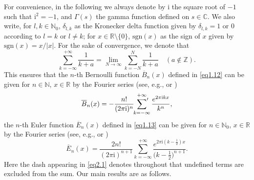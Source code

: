 \documentclass[reqno]{amsart}
\numberwithin{equation}{section}
\begin{document}
For convenience, in the following we always denote by $\mathrm{i}$ the square root of $-1$ such that $\mathrm{i}^{2}=-1$, and $\Gamma(s)$ the gamma function defined on $s\in\mathbb{C}$. We also write, for $l,k\in\mathbb{N}_{0}$, $\delta_{l,k}$ as the Kronecker delta function given by $\delta_{l,k}=1$ or $0$ according to $l=k$ or $l\not=k$; for $x\in\mathbb{R}\setminus\{0\}$, $\mathrm{sgn}(x)$ as the sign of $x$ given by $\mathrm{sgn}(x)=x/|x|$. For the sake of convergence, we denote that
\begin{equation*}
\sum_{k=-\infty}^{+\infty}\frac{1}{k+a}=\lim_{N\rightarrow\infty}\sum_{k=-N}^{N}\frac{1}{k+a}\quad(a\not\in\mathbb{Z}).
\end{equation*}
This ensures that the $n$-th Bernoulli function $\overline{B}_{n}(x)$ defined in \eqref{eq1.12} can be given for $n\in\mathbb{N}$, $x\in\mathbb{R}$ by the Fourier series (see, e.g., \cite[Corollary 3.2]{he3} or \cite[Corollary 3.3]{he3})
\begin{equation}\label{eq2.1}
\overline{B}_{n}(x)=-\frac{n!}{(2\pi\mathrm{i})^{n}}\sideset{}{'}\sum_{k=-\infty}^{+\infty}\frac{e^{2\pi\mathrm{i}kx}}{k^{n}},
\end{equation}
the $n$-th Euler function $\overline{E}_{n}(x)$ defined in \eqref{eq1.13} can be given for $n\in\mathbb{N}_{0}$, $x\in\mathbb{R}$ by the Fourier series (see, e.g., \cite[Corollary 3.2]{he3} or \cite[Corollary 3.3]{he3})
\begin{equation}\label{eq2.2}
\overline{E}_{n}(x)=\frac{2n!}{(2\pi\mathrm{i})^{n+1}}\sum_{k=-\infty}^{+\infty}\frac{e^{2\pi\mathrm{i}(k-\frac{1}{2})x}}{\bigl(k-\frac{1}{2}\bigl)^{n+1}}.
\end{equation}
Here the dash appearing in \eqref{eq2.1} denotes throughout that undefined terms are excluded from the sum. Our main results are as follows.
\end{document}
